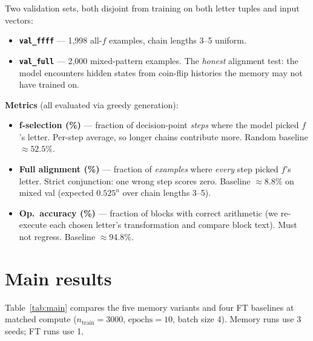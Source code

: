 \documentclass[10pt]{article}
\begin{document}
Two validation sets, both disjoint from training on both letter tuples
and input vectors:
\begin{itemize}[leftmargin=1.5em,itemsep=1pt]
  \item \textbf{\texttt{val\_ffff}} --- 1{,}998 all-$f$ examples,
    chain lengths 3--5 uniform.
  \item \textbf{\texttt{val\_full}} --- 2{,}000 mixed-pattern examples.
    The \emph{honest} alignment test: the model encounters hidden states
    from coin-flip histories the memory may not have trained on.
\end{itemize}

\textbf{Metrics} (all evaluated via greedy generation):

\begin{itemize}[leftmargin=1.5em,itemsep=2pt]
  \item \textbf{f-selection (\%)} --- fraction of decision-point
    \emph{steps} where the model picked $f$'s letter. Per-step average,
    so longer chains contribute more. Random baseline $\approx 52.5\%$.

  \item \textbf{Full alignment (\%)} --- fraction of \emph{examples}
    where \emph{every} step picked $f$'s letter. Strict conjunction: one
    wrong step scores zero. Baseline $\approx 8.8\%$ on mixed val (expected
    $0.525^n$ over chain lengths 3--5).

  \item \textbf{Op.\ accuracy (\%)} --- fraction of blocks with correct
    arithmetic (we re-execute each chosen letter's transformation and
    compare block text). Must not regress. Baseline $\approx 94.8\%$.
\end{itemize}

\section{Main results}

Table~\ref{tab:main} compares the five memory variants and four FT
baselines at matched compute ($n_\text{train}{=}3000$, $\text{epochs}{=}10$,
batch size 4). Memory runs use 3 seeds; FT runs use 1.
\end{document}
